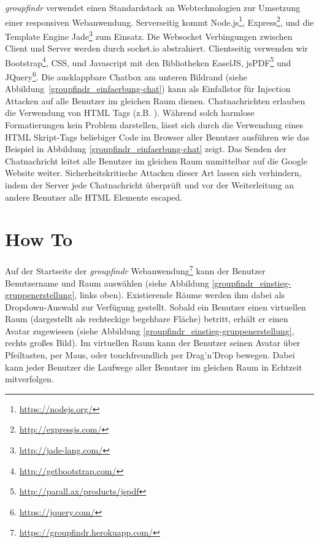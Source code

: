 \emph{groupfindr} verwendet einen Standardstack an Webtechnologien zur Umsetzung einer responsiven Webanwendung. Serverseitig kommt Node.js\footnote{\url{https://nodejs.org/}}, Express\footnote{\url{http://expressjs.com/}}, und die Template Engine Jade\footnote{\url{http://jade-lang.com/}} zum Einsatz. Die Websocket Verbingungen zwischen Client und Server werden durch socket.io abstrahiert. Clientseitig verwenden wir Bootstrap\footnote{\url{http://getbootstrap.com/}}, CSS, und Javascript mit den Bibliotheken EaselJS, jsPDF\footnote{\url{http://parall.ax/products/jspdf}} und JQuery\footnote{\url{https://jquery.com/}}.
\newline\newline
Die ausklappbare Chatbox am unteren Bildrand (siehe Abbildung~\ref{groupfindr_einfaerbung-chat}) kann als Einfallstor für Injection Attacken auf alle Benutzer im gleichen Raum dienen. Chatnachrichten erlauben die Verwendung von HTML Tags (z.B. ). Während solch harmlose Formatierungen kein Problem darstellen, lässt sich durch die Verwendung eines HTML Skript-Tags beliebiger Code im Browser aller Benutzer ausführen wie das Beispiel in Abbildung \ref{groupfindr_einfaerbung-chat} zeigt. 
\newline
Das Senden der Chatnachricht  leitet alle Benutzer im gleichen Raum unmittelbar auf die Google Website weiter. Sicherheitskritische Attacken dieser Art lassen sich verhindern, indem der Server jede Chatnachricht überprüft und vor der Weiterleitung an andere Benutzer alle HTML Elemente escaped.

\section{How To}
\label{how_to}

Auf der Startseite der \emph{groupfindr} Webanwendung\footnote{\url{https://groupfindr.herokuapp.com/}} kann der Benutzer Benutzername und Raum auswählen (siehe Abbildung \ref{groupfindr_einstieg-gruppenerstellung}, links oben). Existierende Räume werden ihm dabei als Dropdown-Auswahl zur Verfügung gestellt. Sobald ein Benutzer einen virtuellen Raum (dargestellt als rechteckige begehbare Fläche) betritt, erhält er einen Avatar zugewiesen (siehe Abbildung \ref{groupfindr_einstieg-gruppenerstellung}, rechts großes Bild). Im virtuellen Raum kann der Benutzer seinen Avatar über Pfeiltasten, per Maus, oder touchfreundlich per Drag’n’Drop bewegen. Dabei kann jeder Benutzer die Laufwege aller Benutzer im gleichen Raum in Echtzeit mitverfolgen.

